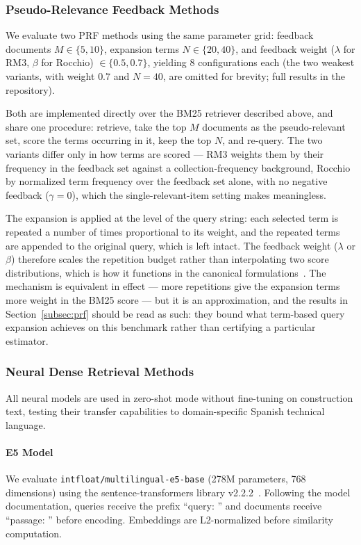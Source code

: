 \documentclass[preprint,review,12pt]{elsarticle}
\begin{document}
\subsubsection{Pseudo-Relevance Feedback Methods}

We evaluate two PRF methods using the same parameter grid: feedback documents $M \in \{5, 10\}$, expansion terms $N \in \{20, 40\}$, and feedback weight ($\lambda$ for RM3, $\beta$ for Rocchio) $\in \{0.5, 0.7\}$, yielding 8 configurations each (the two weakest variants, with weight $0.7$ and $N=40$, are
omitted for brevity; full results in the repository).

Both are implemented directly over the BM25 retriever described above, and share one procedure: retrieve, take the top $M$ documents as the pseudo-relevant set, score the terms occurring in it, keep the top $N$, and re-query. The two variants differ only in how terms are scored --- RM3 weights them by their frequency in the feedback set against a collection-frequency background, Rocchio by normalized term frequency over the feedback set alone, with no negative feedback ($\gamma = 0$), which the single-relevant-item setting makes meaningless.

The expansion is applied at the level of the query string: each selected term is repeated a number of times proportional to its weight, and the repeated terms are appended to the original query, which is left intact. The feedback weight ($\lambda$ or $\beta$) therefore scales the repetition budget rather than interpolating two score distributions, which is how it functions in the canonical formulations~\citep{abdul2004umass, rocchio1971relevance}. The mechanism is equivalent in effect --- more repetitions give the expansion terms more weight in the BM25 score --- but it is an approximation, and the results in Section~\ref{subsec:prf} should be read as such: they bound what term-based query expansion achieves on this benchmark rather than certifying a particular estimator.

\subsubsection{Neural Dense Retrieval Methods}
\label{subsec:neural_methods}

All neural models are used in zero-shot mode without fine-tuning on construction text, testing their transfer capabilities to domain-specific Spanish technical language.

\paragraph{E5 Model}
We evaluate \texttt{intfloat/multilingual-e5-base} (278M parameters, 768 dimensions) using the sentence-transformers library v2.2.2~\citep{reimers2019sentence}. Following the model documentation, queries receive the prefix ``query: '' and documents receive ``passage: '' before encoding. Embeddings are L2-normalized before similarity computation.
\end{document}
